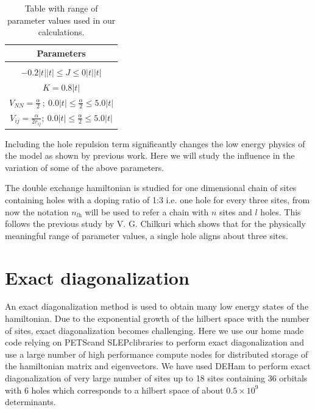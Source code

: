 \documentclass[12pt,twoside]{report}
\newcommand{\citepetsc}{\cite{petsc_web_page,petsc_user_ref,petsc_efficient}}
\newcommand{\citeslepc}{\cite{Hernandez_2003_SSL,slepc_users_manual}}
\begin{document}
	\begin{table}[h!]
		\centering
		\begin{tabular}{||c||}
			\hline
			Parameters  \\ [0.5ex]
			\hline\hline
			\\
			$ -0.2|t|\lvert t \rvert \le J \le 0|t|\lvert t \rvert $    \\ [1ex]
			$  K = 0.8 |t| $                                    \\ [1ex]
			$ V_{NN} = \frac{\alpha}{2}\ ;\ 0.0|t| \le \frac{\alpha}{2} \le 5.0|t| $ \\ [1ex]
			$ V_{ij} = \frac{\alpha}{2r_{ij}} ;\ 0.0|t| \le \frac{\alpha}{2} \le 5.0|t|$                                \\ [1ex]
			\hline
		\end{tabular}
		\label{tab:params}
		\caption{Table with range of parameter values used in our calculations.}
	\end{table}
	
	Including the hole repulsion term significantly changes the low energy physics
	of the model as shown by previous work\cite{calzado_proposal_2001}. Here we will
	study the influence in the variation of some of the above parameters.
	
	
	
	The double exchange hamiltonian is studied for one dimensional chain of
	sites containing holes with a doping ratio of 1:3 i.e. one hole for every
	three sites, from now the notation $n_{l\text{h}}$ will be used to refer a chain
	with $n$ sites and $l$ holes. This follows the previous study by V. G.
	Chilkuri which shows that for the physically meaningful range of parameter
	values, a single hole aligns about three sites.\cite{crystals_chilkuri}
	
	\section{Exact diagonalization}
	
	An exact diagonalization method is used to obtain many low energy states of
	the hamiltonian. Due to the exponential growth of the hilbert space with the
	number of sites, exact diagonalization becomes challenging. Here we use our
	home made code relying on PETSc\citepetsc and SLEPc\citeslepc libraries to
	perform exact diagonalization and use a large number of high performance
	compute nodes for distributed storage of the hamiltonian matrix and
	eigenvectors. We have used DEHam\cite{deham} to perform exact
	diagonalization of very large number of sites up to 18 sites containing 36
	orbitals with 6 holes which corresponds to a hilbert space of about $0.5
	\times 10^9$ determinants.
	
\end{document}
